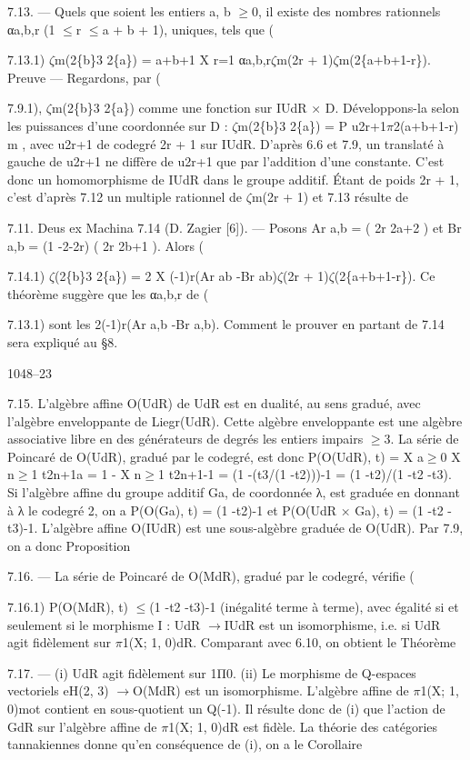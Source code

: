 \documentclass[11pt]{article}
\begin{document}
7.13. --- Quels que soient les entiers a, b \(\ge\)0, il existe des nombres rationnels αa,b,r (1 \(\le\)r \(\le\)a + b + 1), uniques, tels que (

7.13.1) \(\zeta\)m(2\{b\}3 2\{a\}) = a+b+1 X r=1 αa,b,r\(\zeta\)m(2r + 1)\(\zeta\)m(2\{a+b+1-r\}). Preuve --- Regardons, par (

7.9.1), \(\zeta\)m(2\{b\}3 2\{a\}) comme une fonction sur IUdR × D. Développons-la selon les puissances d’une coordonnée sur D : \(\zeta\)m(2\{b\}3 2\{a\}) = P u2r+1\(\pi\)2(a+b+1-r) m , avec u2r+1 de codegré 2r + 1 sur IUdR. D’après 6.6 et 7.9, un translaté à gauche de u2r+1 ne diffère de u2r+1 que par l’addition d’une constante. C’est donc un homomorphisme de IUdR dans le groupe additif. Étant de poids 2r + 1, c’est d’après 7.12 un multiple rationnel de \(\zeta\)m(2r + 1) et 7.13 résulte de 

7.11. Deus ex Machina 7.14 (D. Zagier [6]). --- Posons Ar a,b = ( 2r 2a+2 ) et Br a,b = (1 -2-2r) ( 2r 2b+1 ). Alors (

7.14.1) \(\zeta\)(2\{b\}3 2\{a\}) = 2 X (-1)r(Ar ab -Br ab)\(\zeta\)(2r + 1)\(\zeta\)(2\{a+b+1-r\}). Ce théorème suggère que les αa,b,r de (

7.13.1) sont les 2(-1)r(Ar a,b -Br a,b). Comment le prouver en partant de 7.14 sera expliqué au §8.

1048--23 

7.15. L’algèbre affine O(UdR) de UdR est en dualité, au sens gradué, avec l’algèbre enveloppante de Liegr(UdR). Cette algèbre enveloppante est une algèbre associative libre en des générateurs de degrés les entiers impairs \(\ge\)3. La série de Poincaré de O(UdR), gradué par le codegré, est donc P(O(UdR), t) = X a\(\ge\)0 X n\(\ge\)1 t2n+1a =  1 - X n\(\ge\)1 t2n+1-1 = (1 -(t3/(1 -t2)))-1 = (1 -t2)/(1 -t2 -t3). Si l’algèbre affine du groupe additif Ga, de coordonnée λ, est graduée en donnant à λ le codegré 2, on a P(O(Ga), t) = (1 -t2)-1 et P(O(UdR × Ga), t) = (1 -t2 -t3)-1. L’algèbre affine O(IUdR) est une sous-algèbre graduée de O(UdR). Par 7.9, on a donc Proposition 

7.16. --- La série de Poincaré de O(MdR), gradué par le codegré, vérifie (

7.16.1) P(O(MdR), t) \(\le\)(1 -t2 -t3)-1 (inégalité terme à terme), avec égalité si et seulement si le morphisme I : UdR \(\to\)IUdR est un isomorphisme, i.e. si UdR agit fidèlement sur \(\pi\)1(X; 1, 0)dR. Comparant avec 6.10, on obtient le Théorème 

7.17. --- (i) UdR agit fidèlement sur 1Π0. (ii) Le morphisme de Q-espaces vectoriels eH(2, 3) \(\to\)O(MdR) est un isomorphisme. L’algèbre affine de \(\pi\)1(X; 1, 0)mot contient en sous-quotient un Q(-1). Il résulte donc de (i) que l’action de GdR sur l’algèbre affine de \(\pi\)1(X; 1, 0)dR est fidèle. La théorie des catégories tannakiennes donne qu’en conséquence de (i), on a le Corollaire 
\end{document}

